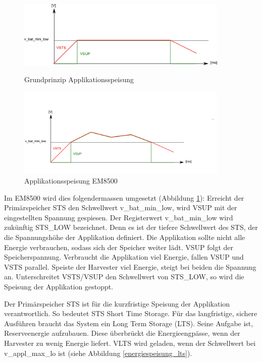\begin{figure}[ht]
 \begin{minipage}[t]{0.5\textwidth}
   \includegraphics[width=0.9\textwidth]{2TheoretischeGrundlagen/imag/levelMitSTsTheoriel.png}
   \caption{Grundprinzip Applikationsspeisung }
   \label{em_grundprinzip} 
 \end{minipage}
 \begin{minipage}[t]{0.5\textwidth}
   \includegraphics[width=0.9\textwidth]{2TheoretischeGrundlagen/imag/levelSTSReal.png}
   \caption{Applikationsspeisung EM8500}
   \label{em_grundprinzip_em8500} 
 \end{minipage}
\end{figure}

Im EM8500 wird dies folgendermassen umgesetzt (Abbildung \ref{em_grundprinzip_em8500}): Erreicht der Primär\-speicher STS den Schwellwert v\_bat\_min\_low, wird VSUP mit der eingestellten Spannung gespiesen. Der Registerwert v\_bat\_min\_low wird zukünftig STS\_LOW bezeichnet. Denn es ist der tiefere Schwellwert des STS, der die Spannungshöhe der Applikation definiert. Die Applikation sollte nicht alle Energie verbrauchen, sodass sich der Speicher weiter lädt.  VSUP folgt der Speicherspannung. Verbraucht die Applikation viel Energie, fallen VSUP und VSTS parallel. Speiste der Harvester viel Energie, steigt bei beiden die Spannung an. Unterschreitet VSTS/VSUP den Schwellwert von STS\_LOW, so wird die Speisung der Applikation gestoppt.

Der Primärspeicher STS ist für die kurzfristige Speisung der Applikation verantwortlich. So bedeutet STS Short Time Storage. Für das langfristige, sichere Ausführen braucht das System ein Long Term Storage (LTS). Seine Aufgabe ist, Reserveenergie aufzubauen. Diese überbrückt die Energieengpässe, wenn der Harvester zu wenig Energie liefert.
VLTS wird geladen, wenn der Schwellwert bei v\_appl\_max\_lo ist (siehe Abbildung \ref{energiespeisung_lts}).

